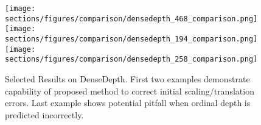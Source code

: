 \begin{figure*}
  \texttt{[image: sections/figures/comparison/densedepth\_468\_comparison.png]}
  \texttt{[image: sections/figures/comparison/densedepth\_194\_comparison.png]}
  \texttt{[image: sections/figures/comparison/densedepth\_258\_comparison.png]}
  \caption{Selected Results on DenseDepth. First two examples demonstrate
    capability of proposed method to correct initial scaling/translation errors.
    Last example shows potential pitfall when ordinal depth is predicted incorrectly.}
\end{figure*}

